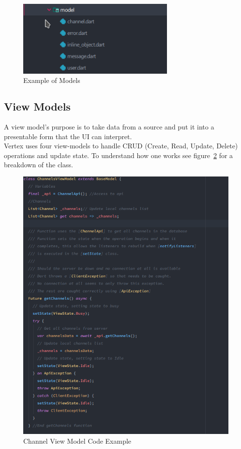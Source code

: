 \begin{figure}[h!]
    \caption{Example of Models}
    \label{image:models}
    \centering
    \includegraphics[width=0.7\textwidth]{images/models.png}
\end{figure}

\subsection{View Models}
A view model's purpose is to take data from a source and put it into a presentable form that the UI can interpret.
\\ Vertex uses four view-models to handle CRUD (Create, Read, Update, Delete) operations and update state. To understand how one works see figure~\ref{image:channelViewModel} for a breakdown of the class.

\begin{figure}[h!]
    \caption{Channel View Model Code Example}
    \label{image:channelViewModel}
    \centering
    \includegraphics[width=1.0\textwidth]{images/channel_view_model_code.png}
\end{figure}

